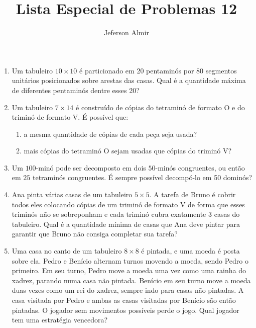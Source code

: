 \documentclass{article}
\title{Lista Especial de Problemas 12}
\author{Jeferson Almir}
\date{}
\begin{document}
\maketitle

\begin{enumerate}
    \item Um tabuleiro $10\times 10$ é particionado em 20 pentaminós
    por 80 segmentos unitários posicionados sobre arestas das casas.
    Qual é a quantidade máxima de diferentes pentaminós dentre esses 20?
    
    \item Um tabuleiro $7\times 14$ é construído de cópias do tetraminó de formato O e do triminó de formato V.
    É possível que:
    
    \begin{enumerate}
    \item a mesma quantidade de cópias de cada peça seja usada?
    
    \item mais cópias do tetraminó O sejam usadas que cópias do triminó V?
    \end{enumerate}
    
    \item Um $100$-minó pode ser decomposto em dois $50$-minós congruentes,
    ou então em $25$ tetraminós congruentes.
    É sempre possível decompó-lo em 50 dominós?
    
    \item Ana pinta várias casas de um tabuleiro $5\times5$.
    A tarefa de Bruno é cobrir todos eles
    colocando cópias de um triminó de formato V de forma que
    esses triminós não se sobreponham e cada triminó cubra exatamente 3 casas do tabuleiro.
    Qual é a quantidade mínima de casas que Ana deve pintar para garantir
    que Bruno não consiga completar sua tarefa?
    
    \item Uma casa no canto de um tabuleiro $8\times 8$ é pintada,
    e uma moeda é posta sobre ela.
    Pedro e Benício alternam turnos movendo a moeda, sendo Pedro o primeiro.
    Em seu turno, Pedro move a moeda uma vez como uma rainha do xadrez,
    parando numa casa não pintada.
    Benício em seu turno move a moeda duas vezes como um rei do xadrez,
    sempre indo para casas não pintadas.
    A casa visitada por Pedro e ambas as casas visitadas por Benício
    são então pintadas.
    O jogador sem movimentos possíveis perde o jogo.
    Qual jogador tem uma estratégia vencedora?
    

\end{enumerate}
\end{document}
